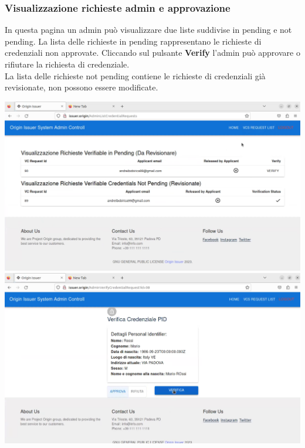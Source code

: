 \subsubsection{Visualizzazione richieste admin e approvazione} 
In questa pagina un admin può visualizzare due liste suddivise in pending e not pending. La lista delle richieste in pending rappresentano le richieste di credenziali non approvate. Cliccando sul pulsante \textbf{Verify} l'admin può approvare o rifiutare la richiesta di credenziale.\\
La lista delle richieste not pending contiene le richieste di credenziali già revisionate, non possono essere modificate.
\begin{center}
    \includegraphics[scale = 0.2]{./res/img/issuer/new/listaadmin1.png}
    \includegraphics[scale = 0.2]{./res/img/issuer/new/listaadmin2.png}
\end{center}


\clearpage